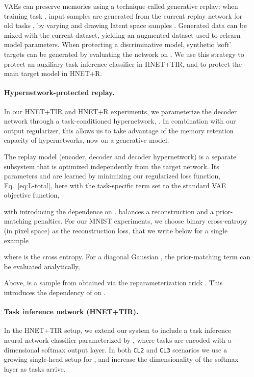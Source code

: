 \documentclass{article}
\begin{document}
VAEs can preserve memories using a technique called generative replay: when training task , input samples are generated from the current replay network for old tasks , by varying   and drawing latent space samples . Generated data can be mixed with the current dataset, yielding an augmented dataset  used to relearn model parameters. When protecting a discriminative model, synthetic `soft' targets can be generated by evaluating the network on . We use this strategy to protect an auxiliary task inference classifier in HNET+TIR, and to protect the main target model in HNET+R.

\paragraph{Hypernetwork-protected replay.} In our HNET+TIR and HNET+R experiments, we parameterize the decoder network through a task-conditioned hypernetwork, . In combination with our output regularizer, this allows us to take advantage of the memory retention capacity of hypernetworks, now on a generative model.

The replay model (encoder, decoder and decoder hypernetwork) is a separate subsystem that is optimized independently from the target network. Its parameters  and  are learned by minimizing our regularized loss function, Eq.~\ref{eq:L-total}, here with the task-specific term set to the standard VAE objective function,

with  introducing the dependence on .  balances a reconstruction  and a prior-matching  penalties. For our MNIST experiments, we choose binary cross-entropy (in pixel space) as the reconstruction loss, that we write below for a single example 

where  is the cross entropy. For a diagonal Gaussian , the prior-matching term can be evaluated analytically,

Above,  is a sample from  obtained via the reparameterization trick \citep{kingma_auto-encoding_2014,rezende_stochastic_2014}. This introduces the dependency of  on .

\paragraph{Task inference network (HNET+TIR).} In the HNET+TIR setup, we extend our system to include a task inference neural network classifier  parameterized by , where tasks are encoded with a -dimensional softmax output layer. In both \texttt{CL2} and \texttt{CL3} scenarios we use a growing single-head setup for , and increase the dimensionality of the softmax layer as tasks arrive.
\end{document}
